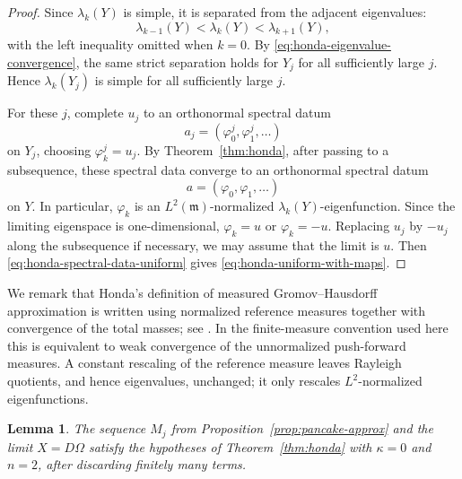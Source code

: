 \documentclass[11pt]{amsart}
\newtheorem{lemma}[theorem]{Lemma}
\numberwithin{equation}{section}
\newcommand{\Om}{\Omega}
\newcommand{\mm}{\mathfrak m}
\begin{document}
\begin{proof}
Since \(\lambda_k(Y)\) is simple, it is separated from the adjacent eigenvalues:
\[
\lambda_{k-1}(Y)<\lambda_k(Y)<\lambda_{k+1}(Y),
\]
with the left inequality omitted when \(k=0\).  By
\eqref{eq:honda-eigenvalue-convergence}, the same strict separation holds for
\(Y_j\) for all sufficiently large \(j\).  Hence \(\lambda_k(Y_j)\) is simple
for all sufficiently large \(j\).

For these \(j\), complete \(u_j\) to an orthonormal spectral datum
\[
a_j=(\varphi^j_0,\varphi^j_1,\ldots)
\]
on \(Y_j\), choosing \(\varphi^j_k=u_j\).  By
Theorem~\ref{thm:honda}, after passing to a subsequence, these spectral data
converge to an orthonormal spectral datum
\[
a=(\varphi_0,\varphi_1,\ldots)
\]
on \(Y\).  In particular, \(\varphi_k\) is an \(L^2(\mm)\)-normalized
\(\lambda_k(Y)\)-eigenfunction.  Since the limiting eigenspace is
one-dimensional, \(\varphi_k=u\) or \(\varphi_k=-u\).  Replacing \(u_j\) by
\(-u_j\) along the subsequence if necessary, we may assume that the limit is
\(u\).  Then \eqref{eq:honda-spectral-data-uniform} gives
\eqref{eq:honda-uniform-with-maps}.
\end{proof}

We remark that
Honda's definition of measured Gromov--Hausdorff approximation is written using
normalized reference measures together with convergence of the total masses; see
\cite[Definition~3.4]{Honda}.  In the finite-measure convention used here this is
equivalent to weak convergence of the unnormalized push-forward measures.  A
constant rescaling of the reference measure leaves Rayleigh quotients, and hence
eigenvalues, unchanged; it only rescales \(L^2\)-normalized eigenfunctions.


\begin{lemma}\label{lem:RCD}
The sequence \(M_j\) from Proposition~\ref{prop:pancake-approx} and the limit
\(X=D\Om\) satisfy the hypotheses of Theorem~\ref{thm:honda} with
\(\kappa=0\) and \(n=2\), after discarding finitely many terms.
\end{lemma}
\end{document}
